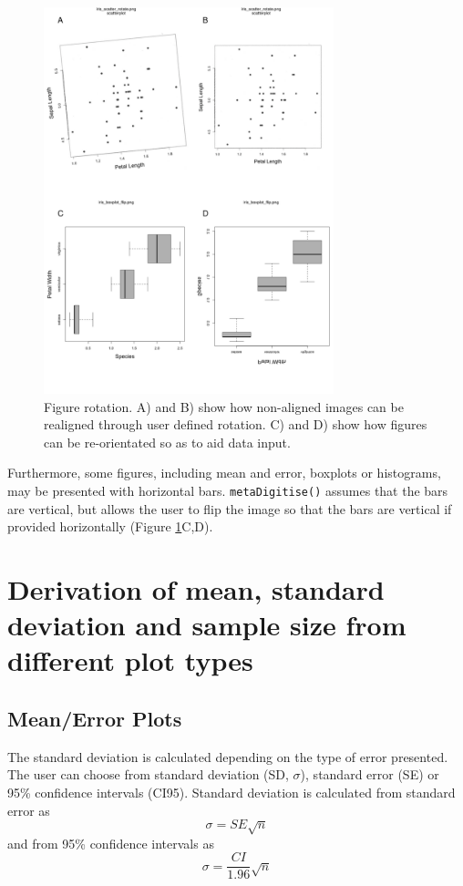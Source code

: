 \documentclass[12pt]{article}
\newcommand{\fct}[1]{\texttt{#1()}}
\begin{document}
\begin{figure}[!b] 
\centering
 \includegraphics[width=0.75\textwidth]{fig_rotate.pdf} 
 \caption{Figure rotation. A) and B) show how non-aligned images can be realigned through user defined rotation. C) and D) show how figures can be re-orientated so as to aid data input.}
\label{fig:rotate}
\end{figure}

Furthermore, some figures, including mean and error, boxplots or histograms, may be presented with horizontal bars. \fct{metaDigitise} assumes that the bars are vertical, but allows the user to flip the image so that the bars are vertical if provided horizontally (Figure \ref{fig:rotate}C,D).

\section{Derivation of mean, standard deviation and sample size from different plot types}

\subsection{Mean/Error Plots}
The standard deviation is calculated depending on the type of error presented. The user can choose from standard deviation (SD, $\sigma$), standard error (SE) or 95\% confidence intervals (CI95). Standard deviation is calculated from standard error as
\begin{equation}
\sigma = SE \sqrt{n}
\end{equation}
and from 95\% confidence intervals as
\begin{equation}
\sigma = \frac{CI}{1.96} \sqrt{n}
\end{equation}
\end{document}

